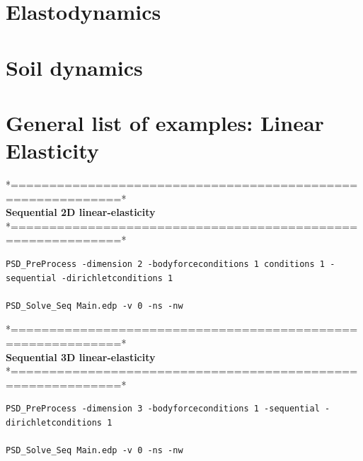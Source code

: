 \pagebreak

\section{Elastodynamics}
\pagebreak

\section{Soil dynamics}



\pagebreak

\section{General list of examples: Linear Elasticity}
 *============================================================*\\
  \textbf{Sequential  2D linear-elasticity}\\                   
 *============================================================*\\
\begin{lstlisting}[style=Linux] 
PSD_PreProcess -dimension 2 -bodyforceconditions 1 conditions 1 -sequential -dirichletconditions 1 
	
PSD_Solve_Seq Main.edp -v 0 -ns -nw 
\end{lstlisting}


*============================================================*\\
 \textbf{Sequential  3D linear-elasticity}                   \\
*============================================================*\\
\begin{lstlisting}[style=Linux] 
PSD_PreProcess -dimension 3 -bodyforceconditions 1 -sequential -dirichletconditions 1

PSD_Solve_Seq Main.edp -v 0 -ns -nw
\end{lstlisting}



